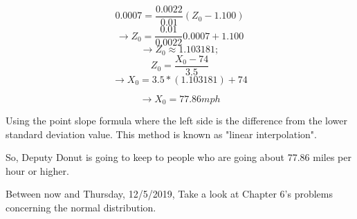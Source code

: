 \documentclass[]{article}
\begin{document}
		$$0.0007 = \dfrac{0.0022}{0.01}(Z_0 -1.100)$$
		$$\to Z_0 = \dfrac{0.01}{0.0022}0.0007 + 1.100$$
		$$\to Z_0 \approx 1.103181;$$
		$$Z_0 = \dfrac{X_0 - 74}{3.5}$$
		$$\to X_0 = 3.5 *(1.103181) + 74$$
		
		$$\to X_0 = 77.86mph$$
		
		Using the point slope formula where the left side is the difference from the lower standard deviation value. This method is known as "linear interpolation".
		
		So, Deputy Donut is going to keep to people who are going about 77.86 miles per hour or higher.
		
		Between now and Thursday, 12/5/2019, Take a look at Chapter 6's problems concerning the normal distribution.
\end{document}

